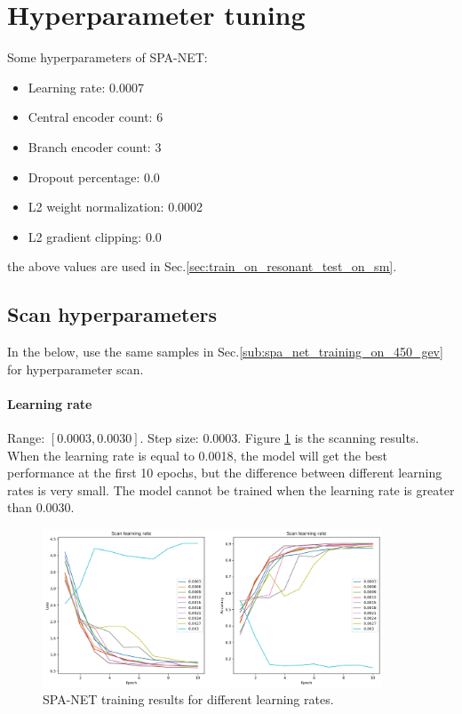 \documentclass[12pt]{article}
\begin{document}
\section{Hyperparameter tuning}%
\label{sec:hyperparameter_tuning}
	Some hyperparameters of SPA-NET:
	\begin{itemize}
		\item Learning rate: 0.0007
		\item Central encoder count: 6
		\item Branch encoder count: 3
		\item Dropout percentage: 0.0
		\item L2 weight normalization: 0.0002
		\item L2 gradient clipping: 0.0
	\end{itemize}
	the above values are used in Sec.\ref{sec:train_on_resonant_test_on_sm}.
	\subsection{Scan hyperparameters}%
	\label{sub:scan_hyperparameters}
		In the below, use the same samples in Sec.\ref{sub:spa_net_training_on_450_gev} for hyperparameter scan.

		\paragraph{Learning rate} Range: $[0.0003,  0.0030]$. Step size: $0.0003$. Figure \ref{fig:SPANet_scan_lr} is the scanning results. When the learning rate is equal to 0.0018, the model will get the best performance at the first 10 epochs, but the difference between different learning rates is very small. The model cannot be trained when the learning rate is greater than 0.0030.
		\begin{figure}[htpb]
			\centering
			\includegraphics[width=0.9\textwidth]{accuracy_curve_hp_scan_lr_450GeV.png}
			\caption{SPA-NET training results for different learning rates.}
			\label{fig:SPANet_scan_lr}
		\end{figure}
\end{document}
